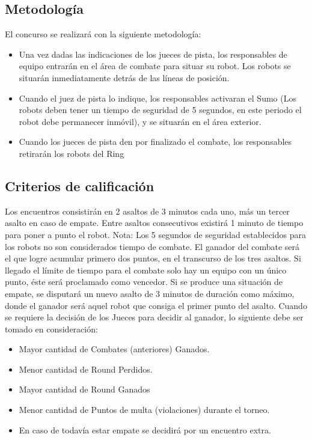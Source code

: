 \documentclass[12pt]{book}
\theoremstyle{definition}
\theoremstyle{remark}
\theoremstyle{plain}
\begin{document}
\subsection{Metodología}
El concurso se realizará con la siguiente metodología: 
\begin{itemize}
 \item Una vez dadas las indicaciones de los jueces de pista, los responsables de equipo entrarán en el área de combate para 
situar su robot. Los robots se situarán inmediatamente detrás de las líneas de posición. 
 \item Cuando el juez de pista lo indique, los responsables activaran el Sumo (Los robots deben tener un tiempo de seguridad
 de 5 segundos, en este periodo el robot debe permanecer inmóvil), y se situarán en el área exterior. 
 \item Cuando los jueces de pista den por finalizado el combate, los responsables retirarán los robots del Ring 
\end{itemize}

\subsection{Criterios de calificación}

Los encuentros consistirán en 2 asaltos de 3 minutos cada uno, más un tercer asalto en caso de empate. Entre asaltos 
consecutivos existirá 1 minuto de tiempo para poner a punto el robot. 
Nota: Los 5 segundos de seguridad establecidos para los robots no son considerados tiempo de combate. 
El ganador del combate será el que logre acumular primero dos puntos, en el transcurso de los tres asaltos. Si llegado 
el límite de tiempo para el combate solo hay un equipo con un único punto, éste será proclamado como vencedor. Si se produce
 una situación de empate, se disputará un nuevo asalto de 3 minutos de duración como máximo, donde el ganador será aquel 
robot que consiga el primer punto del asalto. 
Cuando se requiere la decisión de los Jueces para decidir al ganador, lo siguiente debe ser tomado en consideración: 
\begin{itemize}
 \item Mayor cantidad de Combates (anteriores) Ganados.
 \item Menor cantidad de Round Perdidos. 
 \item Mayor cantidad de Round Ganados 
 \item Menor cantidad de Puntos de multa (violaciones) durante el torneo. 
 \item En caso de todavía estar empate se decidirá por un encuentro extra.
\end{itemize}
\end{document}
